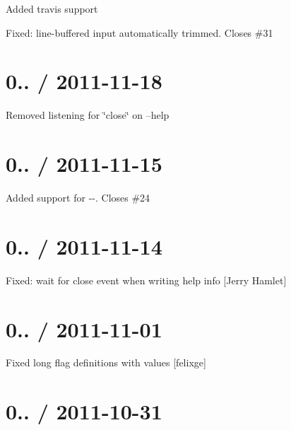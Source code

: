 \begin{DoxyItemize}
\item Added travis support
\item Fixed\+: line-\/buffered input automatically trimmed. Closes \#31
\end{DoxyItemize}

\section*{0.. / 2011-\/11-\/18 }


\begin{DoxyItemize}
\item Removed listening for \char`\"{}close\char`\"{} on --help
\end{DoxyItemize}

\section*{0.. / 2011-\/11-\/15 }


\begin{DoxyItemize}
\item Added support for {\ttfamily -\/-\/}. Closes \#24
\end{DoxyItemize}

\section*{0.. / 2011-\/11-\/14 }


\begin{DoxyItemize}
\item Fixed\+: wait for close event when writing help info \mbox{[}Jerry Hamlet\mbox{]}
\end{DoxyItemize}

\section*{0.. / 2011-\/11-\/01 }


\begin{DoxyItemize}
\item Fixed long flag definitions with values \mbox{[}felixge\mbox{]}
\end{DoxyItemize}

\section*{0.. / 2011-\/10-\/31 }


